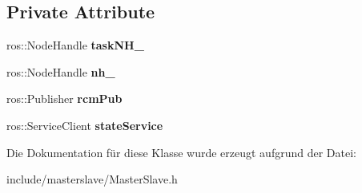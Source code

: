 \subsection*{Private Attribute}
\begin{DoxyCompactItemize}
\item 
\hypertarget{classMasterSlave_a3d15a95210336763c63ac75cc31b0082}{ros\-::\-Node\-Handle {\bfseries task\-N\-H\-\_\-}}\label{classMasterSlave_a3d15a95210336763c63ac75cc31b0082}

\item 
\hypertarget{classMasterSlave_acc17666bfd856c32ad2ca08cea37683c}{ros\-::\-Node\-Handle {\bfseries nh\-\_\-}}\label{classMasterSlave_acc17666bfd856c32ad2ca08cea37683c}

\item 
\hypertarget{classMasterSlave_a3742cdbfc7a31e08d396816d8e1704bb}{ros\-::\-Publisher {\bfseries rcm\-Pub}}\label{classMasterSlave_a3742cdbfc7a31e08d396816d8e1704bb}

\item 
\hypertarget{classMasterSlave_a5a059116c10d34fd2cd70ff2f479cb55}{ros\-::\-Service\-Client {\bfseries state\-Service}}\label{classMasterSlave_a5a059116c10d34fd2cd70ff2f479cb55}

\end{DoxyCompactItemize}


Die Dokumentation für diese Klasse wurde erzeugt aufgrund der Datei\-:\begin{DoxyCompactItemize}
\item 
include/masterslave/Master\-Slave.\-h\end{DoxyCompactItemize}
